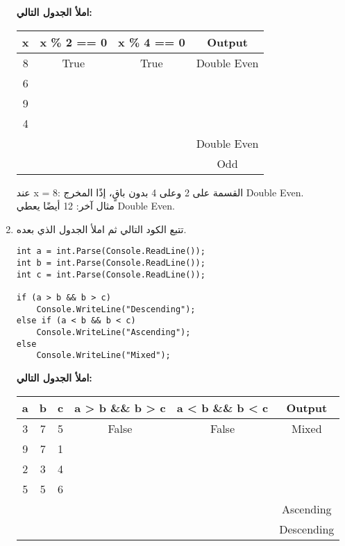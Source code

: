 ﻿\documentclass[12pt]{article}
\begin{document}
\begin{enumerate}[itemsep=2em]
\textbf{املأ الجدول التالي:}
\begin{center}
\begin{tabular}{|c|c|c|c|}
\hline
\textbf{x} & \textenglish{x \% 2 == 0} & \textenglish{x \% 4 == 0} & \textbf{Output} \\
\hline
8 & True & True & Double Even \\
\hline
6 &  &  &  \\
\hline
9 &  &  &  \\
\hline
4 &  &  &  \\
\hline
 &  &  & Double Even \\
\hline
 &  &  & Odd \\
\hline
\end{tabular}
\end{center}

\ifwithsols
\begin{boxSolution}
عند \textenglish{x = 8}: القسمة على 2 وعلى 4 بدون باقٍ، إذًا المخرج \textenglish{Double Even}.\\
مثال آخر: \textenglish{12} أيضًا يعطي \textenglish{Double Even}.
\end{boxSolution}
\fi

\item
تتبع الكود التالي ثم املأ الجدول الذي بعده.

\begin{boxCode}
\begin{english}
\begin{verbatim}
int a = int.Parse(Console.ReadLine());
int b = int.Parse(Console.ReadLine());
int c = int.Parse(Console.ReadLine());

if (a > b && b > c)
    Console.WriteLine("Descending");
else if (a < b && b < c)
    Console.WriteLine("Ascending");
else
    Console.WriteLine("Mixed");
\end{verbatim}
\end{english}
\end{boxCode}

\textbf{املأ الجدول التالي:}

\begin{center}
\begin{tabular}{|c|c|c|c|c|c|}
\hline
\textbf{a} & \textbf{b} & \textbf{c} & \textenglish{a > b \&\& b > c} & \textenglish{a < b \&\& b < c} & \textbf{Output} \\
\hline
3 & 7 & 5 & False & False & Mixed \\
\hline
9 & 7 & 1 &  &  &  \\
\hline
2 & 3 & 4 &  &  &  \\
\hline
5 & 5 & 6 &  &  &  \\
\hline
 &  &  &  &  & Ascending \\
\hline
 &  &  &  &  & Descending \\
\hline
\end{tabular}
\end{center}


\end{enumerate}
\end{document}
